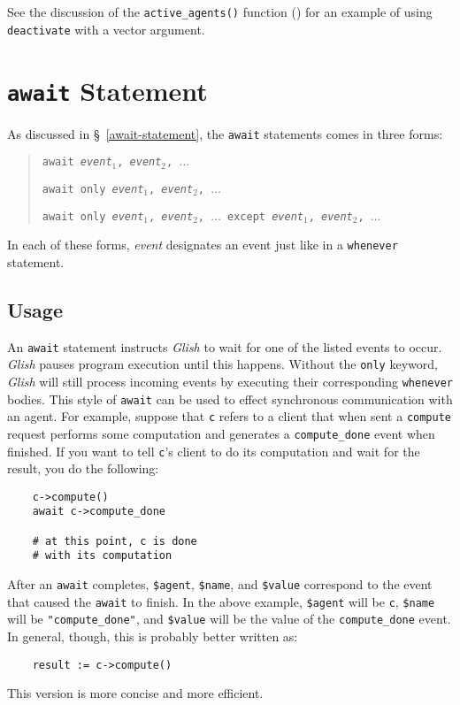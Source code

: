 See the discussion of the {\tt active\_agents()} function
() for an example of using {\tt deactivate} with
a vector argument.


\section{{\tt await} Statement}
\label{await}

As discussed in \S~\ref{await-statement}, the {\tt await} statements comes
in three forms:
\begin{quote}
    {\tt await {\em event$_1$}, {\em event$_2$}, $\ldots$}

    {\tt await only {\em event$_1$}, {\em event$_2$}, $\ldots$}

    {\tt await only {\em event$_1$}, {\em event$_2$}, $\ldots$ except {\em event$_1$}, {\em event$_2$}, $\ldots$}
\end{quote}
In each of these forms, {\em event} designates an event just like
in a {\tt whenever} statement.

\subsection{Usage}

An {\tt await} statement instructs {\em Glish} to wait for one of the listed
events to occur.  {\em Glish} pauses program execution until this happens.
Without the {\tt only} keyword, {\em Glish} will still process incoming
events by executing their corresponding {\tt whenever} bodies.
This style of {\tt await} can be used to effect synchronous communication
with an agent.
For example, suppose that {\tt c} refers to a client
that when sent a {\tt compute} request performs some computation and
generates a {\tt compute\_done} event when finished.  If you want to tell
{\tt c}'s client to do its computation and wait for the result, you
do the following:
\begin{verbatim}
    c->compute()
    await c->compute_done

    # at this point, c is done
    # with its computation
\end{verbatim}
After an {\tt await} completes, {\tt \$agent}, {\tt \$name}, and {\tt \$value}
correspond to the event that caused the {\tt await} to finish.  In
the above example, {\tt \$agent} will be {\tt c}, {\tt \$name} will
be {\tt "compute\_done"}, and {\tt \$value} will be the value
of the {\tt compute\_done} event. In general, though, this is probably
better written as:
\begin{verbatim}
    result := c->compute()
\end{verbatim}
This version is more concise and more efficient.

